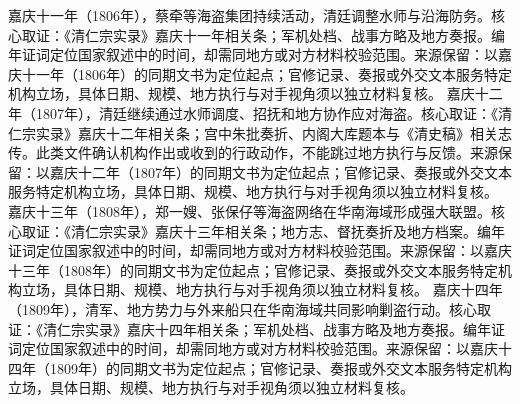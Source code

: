 嘉庆十一年（1806年），蔡牵等海盗集团持续活动，清廷调整水师与沿海防务。核心取证：《清仁宗实录》嘉庆十一年相关条；军机处档、战事方略及地方奏报。编年证词定位国家叙述中的时间，却需同地方或对方材料校验范围。来源保留：以嘉庆十一年（1806年）的同期文书为定位起点；官修记录、奏报或外交文本服务特定机构立场，具体日期、规模、地方执行与对手视角须以独立材料复核。
嘉庆十二年（1807年），清廷继续通过水师调度、招抚和地方协作应对海盗。核心取证：《清仁宗实录》嘉庆十二年相关条；宫中朱批奏折、内阁大库题本与《清史稿》相关志传。此类文件确认机构作出或收到的行政动作，不能跳过地方执行与反馈。来源保留：以嘉庆十二年（1807年）的同期文书为定位起点；官修记录、奏报或外交文本服务特定机构立场，具体日期、规模、地方执行与对手视角须以独立材料复核。
嘉庆十三年（1808年），郑一嫂、张保仔等海盗网络在华南海域形成强大联盟。核心取证：《清仁宗实录》嘉庆十三年相关条；地方志、督抚奏折及地方档案。编年证词定位国家叙述中的时间，却需同地方或对方材料校验范围。来源保留：以嘉庆十三年（1808年）的同期文书为定位起点；官修记录、奏报或外交文本服务特定机构立场，具体日期、规模、地方执行与对手视角须以独立材料复核。
嘉庆十四年（1809年），清军、地方势力与外来船只在华南海域共同影响剿盗行动。核心取证：《清仁宗实录》嘉庆十四年相关条；军机处档、战事方略及地方奏报。编年证词定位国家叙述中的时间，却需同地方或对方材料校验范围。来源保留：以嘉庆十四年（1809年）的同期文书为定位起点；官修记录、奏报或外交文本服务特定机构立场，具体日期、规模、地方执行与对手视角须以独立材料复核。
